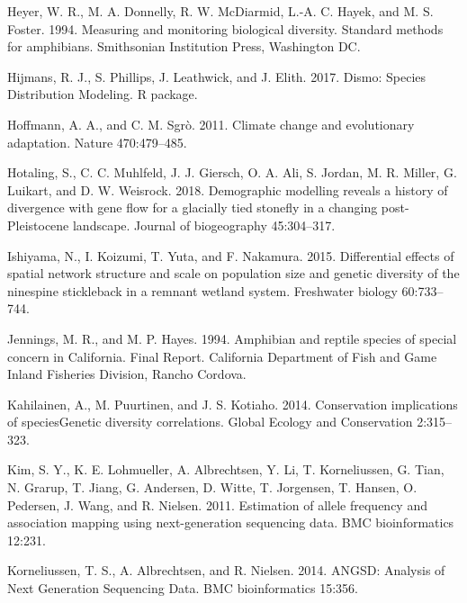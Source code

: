 \documentclass[twoside,12pt,final]{ucthesis-CA2012} %
\begin{document}
\begin{ucmainmatter}
\leavevmode\hypertarget{ref-heyer_measuring_1994}{}%
Heyer, W. R., M. A. Donnelly, R. W. McDiarmid, L.-A. C. Hayek, and M. S.
Foster. 1994. Measuring and monitoring biological diversity. Standard
methods for amphibians. Smithsonian Institution Press, Washington DC.

\leavevmode\hypertarget{ref-hijmans_dismo_2017}{}%
Hijmans, R. J., S. Phillips, J. Leathwick, and J. Elith. 2017. Dismo:
Species Distribution Modeling. R package.

\leavevmode\hypertarget{ref-hoffmann_climate_2011}{}%
Hoffmann, A. A., and C. M. Sgrò. 2011. Climate change and evolutionary
adaptation. Nature 470:479--485.

\leavevmode\hypertarget{ref-hotaling_demographic_2018}{}%
Hotaling, S., C. C. Muhlfeld, J. J. Giersch, O. A. Ali, S. Jordan, M. R.
Miller, G. Luikart, and D. W. Weisrock. 2018. Demographic modelling
reveals a history of divergence with gene flow for a glacially tied
stonefly in a changing post-Pleistocene landscape. Journal of
biogeography 45:304--317.

\leavevmode\hypertarget{ref-ishiyama_differential_2015}{}%
Ishiyama, N., I. Koizumi, T. Yuta, and F. Nakamura. 2015. Differential
effects of spatial network structure and scale on population size and
genetic diversity of the ninespine stickleback in a remnant wetland
system. Freshwater biology 60:733--744.

\leavevmode\hypertarget{ref-jennings_amphibian_1994}{}%
Jennings, M. R., and M. P. Hayes. 1994. Amphibian and reptile species of
special concern in California. Final Report. California Department of
Fish and Game Inland Fisheries Division, Rancho Cordova.

\leavevmode\hypertarget{ref-kahilainen_conservation_2014}{}%
Kahilainen, A., M. Puurtinen, and J. S. Kotiaho. 2014. Conservation
implications of speciesGenetic diversity correlations. Global Ecology
and Conservation 2:315--323.

\leavevmode\hypertarget{ref-kim_estimation_2011}{}%
Kim, S. Y., K. E. Lohmueller, A. Albrechtsen, Y. Li, T. Korneliussen, G.
Tian, N. Grarup, T. Jiang, G. Andersen, D. Witte, T. Jorgensen, T.
Hansen, O. Pedersen, J. Wang, and R. Nielsen. 2011. Estimation of allele
frequency and association mapping using next-generation sequencing data.
BMC bioinformatics 12:231.

\leavevmode\hypertarget{ref-korneliussen_angsd_2014}{}%
Korneliussen, T. S., A. Albrechtsen, and R. Nielsen. 2014. ANGSD:
Analysis of Next Generation Sequencing Data. BMC bioinformatics 15:356.


\end{ucmainmatter}
\end{document}
